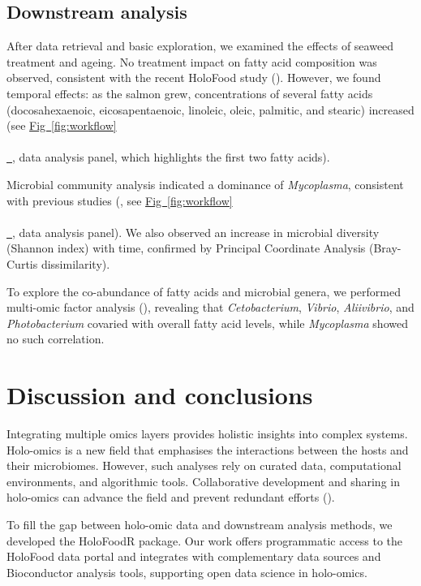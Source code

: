 \documentclass[unnumsec,webpdf,namedate,modern,large]{oup-authoring-template}%
\newcommand*{\figref}[2][]{%
  \hyperref[{fig:#2}]{%
    Fig~\ref*{fig:#2}%
    \ifx\\#1\\%
    \else
      \,#1%
    \fi
  }%
}
\begin{document}
\vspace{-1em}
\subsection{Downstream analysis}

After data retrieval and basic exploration, we examined the effects of seaweed treatment and ageing. No treatment impact on fatty acid composition was observed, consistent with the recent HoloFood study (\cite{rasmussen_holo-omics_2025}). However, we found temporal effects: as the salmon grew, concentrations of several fatty acids (docosahexaenoic, eicosapentaenoic, linoleic, oleic, palmitic, and stearic) increased (see \figref{workflow}, data analysis panel, which highlights the first two fatty acids).

Microbial community analysis indicated a dominance of {\it Mycoplasma}, consistent with previous studies ({\cite{zarkasiPyrosequencingbasedCharacterizationGastrointestinal2014,bozzi_salmon_2021}}, see \figref{workflow}, data analysis panel). We also observed an increase in microbial diversity (Shannon index) with time, confirmed by Principal Coordinate Analysis (Bray-Curtis dissimilarity).

To explore the co-abundance of fatty acids and microbial genera, we performed multi-omic factor analysis (\cite{argelaguet_mofa_2020}), revealing that {\it Cetobacterium}, {\it Vibrio}, {\it Aliivibrio}, and {\it Photobacterium} covaried with overall fatty acid levels, while {\it Mycoplasma} showed no such correlation.

\section{Discussion and conclusions}

Integrating multiple omics layers provides holistic insights into complex systems. Holo-omics is a new field that emphasises the interactions between the hosts and their microbiomes. However, such analyses rely on curated data, computational environments, and algorithmic tools. Collaborative development and sharing in holo-omics can advance the field and prevent redundant efforts (\cite{open_microbiome, lahti_open_2018}).

To fill the gap between holo-omic data and downstream analysis methods, we developed the HoloFoodR package. Our work offers programmatic access to the HoloFood data portal and integrates with complementary data sources and Bioconductor analysis tools, supporting open data science in holo-omics.
\end{document}
